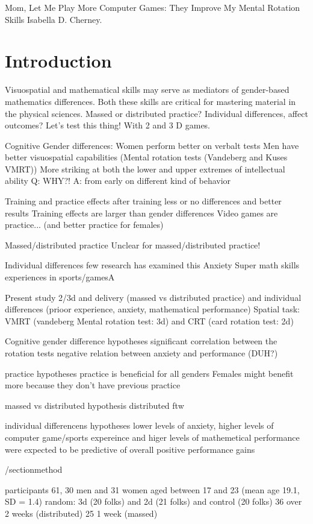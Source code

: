 Mom, Let Me Play More Computer Games: They Improve My Mental Rotation Skills
Isabella D. Cherney.


\section{Introduction}
Visuospatial and mathematical skills may serve as mediators of 
gender-based mathematics differences. Both these skills are critical for
mastering material in the physical sciences. 
Massed or distributed practice? 
Individual differences, affect outcomes?
Let's test this thing! With 2 and 3 D games.

Cognitive Gender differences:
Women perform better on verbalt tests
Men have better visuospatial capabilities (Mental rotation tests (Vandeberg 
and Kuses VMRT))
More striking at both the lower and upper extremes of intellectual ability
Q: WHY?!
A: from early on different kind of behavior 

Training and practice effects
after training less or no differences and better
results
Training effects are larger than gender differences
Video games are practice...  (and better practice for females)

Massed/distributed practice
Unclear for massed/distributed practice! 

Individual differences
few research has examined this
Anxiety
Super math skills
experiences in sports/gamesA

Present study
2/3d and delivery (massed vs distributed practice) and individual differences
(prioor experience, anxiety, mathematical performance)
Spatial task: VMRT (vandeberg Mental rotation test: 3d) and CRT (card rotation test: 2d) 

Cognitive gender difference hypotheses
significant correlation between the rotation tests
negative relation between anxiety and performance (DUH?)

practice hypotheses
practice is beneficial for all genders
Females might benefit more because they don't have previous practice

massed vs distributed hypothesis
distributed ftw

individual differencens hypotheses
lower levels of anxiety, higher levels of computer game/sports expereince 
and higer levels of mathemetical performance were expected to be predictive
of overall positive performance gains

/section{method}

participants
61, 30 men and 31 women
aged between 17 and 23 (mean age 19.1, SD = 1.4)
random: 3d (20 folks) and 2d (21 folks) and control (20 folks)
36 over 2 weeks (distributed)
25 1 week (massed)

